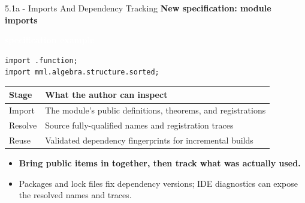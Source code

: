 \documentclass[aspectratio=169,11pt]{beamer}
\newcommand{\statusbadge}[2]{\colorbox{#1}{\textcolor{white}{\strut\scriptsize\sffamily\bfseries #2}}}
\newcommand{\badgeSpec}{\statusbadge{green!35!black}{specification example}}
\begin{document}
\begin{frame}[fragile,t]{5.1a - Imports And Dependency Tracking}
\smallskip
\textbf{New specification: module imports}~\badgeSpec
\begin{lstlisting}[language={mizar},basicstyle=\ttfamily\small]
import .function;
import mml.algebra.structure.sorted;
\end{lstlisting}
\begin{footnotesize}
\setlength{\tabcolsep}{3pt}
\renewcommand{\arraystretch}{1.15}
\begin{tabularx}{\textwidth}{>{\raggedright\arraybackslash}X>{\raggedright\arraybackslash}X}
\toprule
\textbf{Stage} & \textbf{What the author can inspect} \\
\midrule
Import & The module's public definitions, theorems, and registrations \\
Resolve & Source fully-qualified names and registration traces \\
Reuse & Validated dependency fingerprints for incremental builds \\
\bottomrule
\end{tabularx}
\end{footnotesize}

\begin{itemize}
\setlength{\itemsep}{1pt}
\setlength{\parsep}{0pt}
\setlength{\parskip}{0pt}
\item \textcolor{blue!55!black}{\textbf{Bring public items in together, then track what was actually used.}}
\item Packages and lock files fix dependency versions; IDE diagnostics can expose the resolved names and traces.
\end{itemize}
\end{frame}
\end{document}
